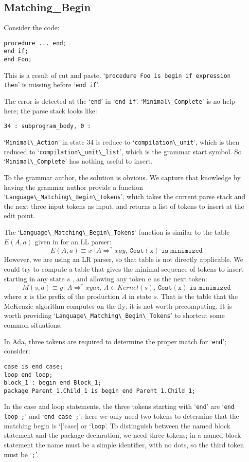\documentclass{article}
\newcommand{\code}[1]{`\lstinline|#1|'}
\begin{document}
\subsection{Matching\_Begin}
Consider the code:
\begin{lstlisting}
procedure ... end;
end if;
end Foo;
\end{lstlisting}
This is a result of cut and paste.
\code{procedure Foo is begin if expression then} is missing before
\code{end if}.

The error is detected at the \code{end} in \code{end if}.
\code{Minimal\_Complete} is no help here; the parse stack looks like:
\begin{verbatim}
34 : subprogram_body, 0 :
\end{verbatim}
\code{Minimal\_Action} in state 34 is reduce to
\code{compilation\_unit}, which is then reduced to
\code{compilation\_unit\_list}, which is the grammar start symbol. So
\code{Minimal\_Complete} has nothing useful to insert.

To the grammar author, the solution is obvious. We capture that
knowledge by having the grammar author provide a function
\code{Language\_Matching\_Begin\_Tokens}, which takes the current parse
stack and the next three input tokens as input, and returns a list of
tokens to insert at the edit point.

The \code{Language\_Matching\_Begin\_Tokens} function is similar to the
table $E(A,a)$ given in \cite{FMQ 1980} for an LL parser:
\begin{equation}
E(A,a) \equiv x \, | \, A \Rightarrow^* xay, \, \mathtt{Cost(x)\; is\; minimized}
\end{equation}
However, we are using an LR parser, so that table is not directly
applicable. We could try to compute a table that gives the minimal
sequence of tokens to insert starting in any state $s$ , and
allowing any token $a$ as the next token:
\begin{equation}
M(s,a) \equiv y \, | \, A \Rightarrow^* xyaz, \, A \in Kernel(s), \, \mathtt{Cost(x)\; is\; minimized}
\end{equation}
where $x$ is the prefix of the production $A$ in state $s$.
That is the table that the McKenzie algorithm computes on the fly; it
is not worth precomputing. It is worth providing
\code{Language\_Matching\_Begin\_Tokens} to shortcut some common
situations.

In Ada, three tokens are required to determine the proper match for
\code{end}; consider:
\begin{lstlisting}
case is end case;
loop end loop;
block_1 : begin end Block_1;
package Parent_1.Child_1 is begin end Parent_1.Child_1;
\end{lstlisting}
In the case and loop statements, the three tokens starting with
\code{end} are \code{end loop ;} and \code{end case ;}; here we only
need two tokens to determine that the matching begin is \code|case| or
\code{loop}.
To distinguish between the named block statement and the package
declaration, we need three tokens; in a named block statement the name
must be a simple identifier, with no dots, so the third token must be
\code{;}.
\end{document}
